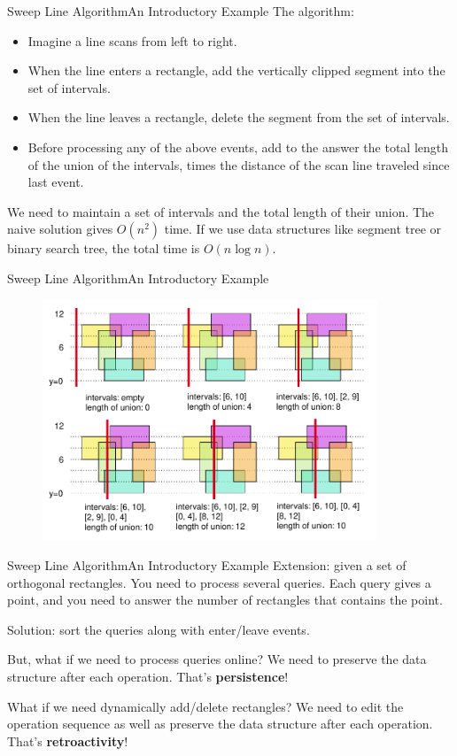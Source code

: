 \documentclass{beamer}
\begin{document}
\begin{frame}{Sweep Line Algorithm}{An Introductory Example}
The algorithm:
\begin{itemize}
	\item Imagine a line scans from left to right.
	\item When the line enters a rectangle, add the vertically clipped segment into the set of intervals.
	\item When the line leaves a rectangle, delete the segment from the set of intervals.
	\item Before processing any of the above events, add to the answer the total length of the union of the intervals, times the distance of the scan line traveled since last event.
\end{itemize}

\pause

We need to maintain a set of intervals and the total length of their union. The naive solution gives $O(n^2)$ time. If we use data structures like segment tree or binary search tree, the total time is $O(n \log n)$.
\end{frame}

\begin{frame}{Sweep Line Algorithm}{An Introductory Example}
\begin{figure}
\centering
\includegraphics[width=10cm]{sweep.pdf}
\end{figure}
\end{frame}

\begin{frame}{Sweep Line Algorithm}{An Introductory Example}
Extension: given a set of orthogonal rectangles. You need to process several queries. Each query gives a point, and you need to answer the number of rectangles that contains the point.

\pause

Solution: sort the queries along with enter/leave events.

\pause

But, what if we need to process queries online? \pause We need to preserve the data structure after each operation. That's \textbf{persistence}! 

\pause

What if we need dynamically add/delete rectangles? \pause We need to edit the operation sequence as well as preserve the data structure after each operation. That's \textbf{retroactivity}!
\end{frame}
\end{document}
